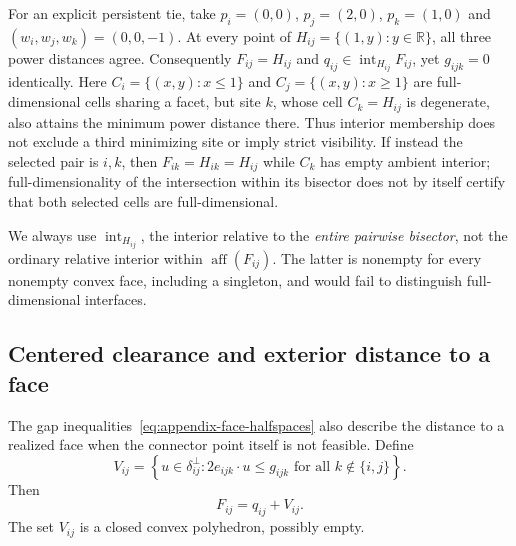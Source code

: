 For an explicit persistent tie, take $p_i=(0,0)$, $p_j=(2,0)$, $p_k=(1,0)$ and $(w_i,w_j,w_k)=(0,0,-1)$. At every point of $H_{ij}=\{(1,y):y\in\mathbb R\}$, all three power distances agree. Consequently $F_{ij}=H_{ij}$ and $q_{ij}\in\operatorname{int}_{H_{ij}}F_{ij}$, yet $g_{ijk}=0$ identically. Here $C_i=\{(x,y):x\le1\}$ and $C_j=\{(x,y):x\ge1\}$ are full-dimensional cells sharing a facet, but site $k$, whose cell $C_k=H_{ij}$ is degenerate, also attains the minimum power distance there. Thus interior membership does not exclude a third minimizing site or imply strict visibility. If instead the selected pair is $i,k$, then $F_{ik}=H_{ik}=H_{ij}$ while $C_k$ has empty ambient interior; full-dimensionality of the intersection within its bisector does not by itself certify that both selected cells are full-dimensional.

We always use $\operatorname{int}_{H_{ij}}$, the interior relative to the \emph{entire pairwise bisector}, not the ordinary relative interior within $\operatorname{aff}(F_{ij})$. The latter is nonempty for every nonempty convex face, including a singleton, and would fail to distinguish full-dimensional interfaces.

\subsection{Centered clearance and exterior distance to a face}
\label{app:geometry-exterior}

The gap inequalities~\eqref{eq:appendix-face-halfspaces} also describe the distance to a realized face when the connector point itself is not feasible. Define
\begin{equation}
V_{ij}=\left\{u\in\delta_{ij}^{\perp}:
2e_{ijk}\cdot u\le g_{ijk}
\text{ for all }k\notin\{i,j\}\right\}.
\label{eq:face-displacement-feasible-set}
\end{equation}
Then
\begin{equation}
F_{ij}=q_{ij}+V_{ij}.
\label{eq:face-displacement}
\end{equation}
The set $V_{ij}$ is a closed convex polyhedron, possibly empty.

